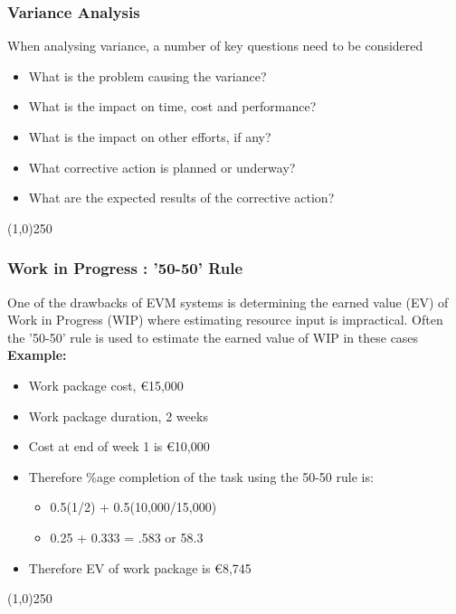 \begin{frame}
\frametitle{Variance Analysis}
When analysing variance, a number of key questions need to be considered
\begin{itemize}
	\item What is the problem causing the variance?
	\item What is the impact on time, cost and performance?
	\item What is the impact on other efforts, if any?
	\item What corrective action is planned or underway?
	\item What are the expected results of the corrective action?
\end{itemize}
\end{frame}
\begin{center}\line(1,0){250}\end{center}







\begin{frame}
\frametitle{Work in Progress : ’50-50’ Rule}
One of the drawbacks of EVM systems is  determining the earned value (EV) of Work in Progress (WIP) where estimating resource input is impractical.  Often the ’50-50’ rule is used to estimate the earned value of WIP in these cases\\
\textbf{Example:}
\begin{itemize}
	\item Work package cost, \euro15,000
	\item Work package duration, 2 weeks
	\item Cost at end of week 1 is \euro10,000
	\item Therefore \%age completion of the task using the 50-50 rule is:
	\begin{itemize}
		\item 0.5(1/2) + 0.5(10,000/15,000)
		\item	0.25 + 0.333 = .583 or 58.3%
	\end{itemize}
	\item Therefore EV of work package is \euro8,745
\end{itemize}
\end{frame}
\begin{center}\line(1,0){250}\end{center}






